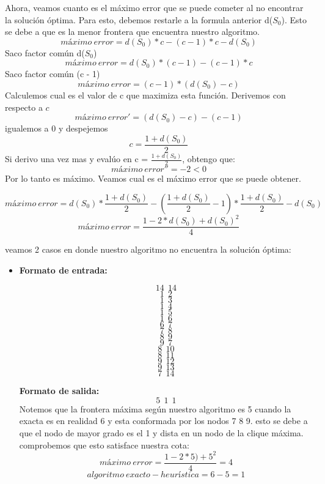 \begin{itemize}
Ahora, veamos cuanto es el máximo error que se puede cometer al no encontrar la solución óptima. Para esto, debemos restarle a la formula anterior d($S_{0}$). Esto se debe a que es la menor frontera que encuentra nuestro algoritmo.
\begin{equation}
  máximo\ error = d(S_{0}) * c - (c - 1) * c - d(S_{0}) 
\end{equation} 
Saco factor común d($S_{0}$)
\begin{equation}
  máximo\ error = d(S_{0}) * (c - 1) - (c - 1) * c 
\end{equation} 
Saco factor común (c - 1)
\begin{equation}
  máximo\ error = (c - 1) * (d(S_{0}) - c) 
\end{equation} 
Calculemos cual es el valor de c que maximiza esta función. Derivemos con respecto a $c$
\begin{equation}
  máximo\ error' = (d(S_{0}) - c) - (c - 1)
\end{equation} 
igualemos a 0 y despejemos
\begin{equation}
  c = \frac{1 + d(S_{0})}{2}
\end{equation} 
Si derivo una vez mas y evalúo en c = $\frac{1 + d(S_{0})}{2}$, obtengo que:
\begin{equation}
  máximo\ error'' = -2 < 0
\end{equation}
Por lo tanto es máximo.\newline \newline
Veamos cual es el máximo error que se puede obtener.

\begin{equation}
  máximo\ error = d(S_{0}) * \frac{1 + d(S_{0})}{2} - (\frac{1 + d(S_{0})}{2} - 1) * \frac{1 + d(S_{0})}{2} - d(S_{0}) 
\end{equation} 
\begin{equation}
  máximo\ error = \frac{1 - 2 * d(S_{0}) + d(S_{0})^{2}}{4} 
\end{equation}

veamos 2 casos en donde nuestro algoritmo no encuentra la solución óptima:
\begin {itemize}
\item
\textbf{Formato de entrada:}

$$14\ \  14$$
$$1\ \  2$$
$$1\ \  3$$
$$1\ \  4$$
$$1\ \  5$$
$$1\ \  6$$
$$6\ \  7$$
$$7 \ \ 8$$
$$8\ \  9$$
$$9\ \  7$$
$$8\ \  10$$
$$8\ \  11$$
$$9\ \  12$$
$$9\ \  13$$
$$7\ \  14$$


\textbf{Formato de salida:}
$$5\ \   1\ \   1$$
Notemos que la frontera máxima según nuestro algoritmo es 5 cuando la exacta es en realidad 6 y esta conformada por los nodos 7 8 9. esto se debe a que el nodo de mayor grado es el 1 y dista en un nodo de la clique máxima. 
\newline
comprobemos que esto satisface nuestra cota:
\begin{equation}
  máximo\ error = \frac{1 - 2 * 5) + 5^{2}}{4} = 4
\end{equation}
\begin{equation}
  algoritmo\ exacto - heurística = 6 - 5 = 1
\end{equation}


\end{itemize}
\end{itemize}
